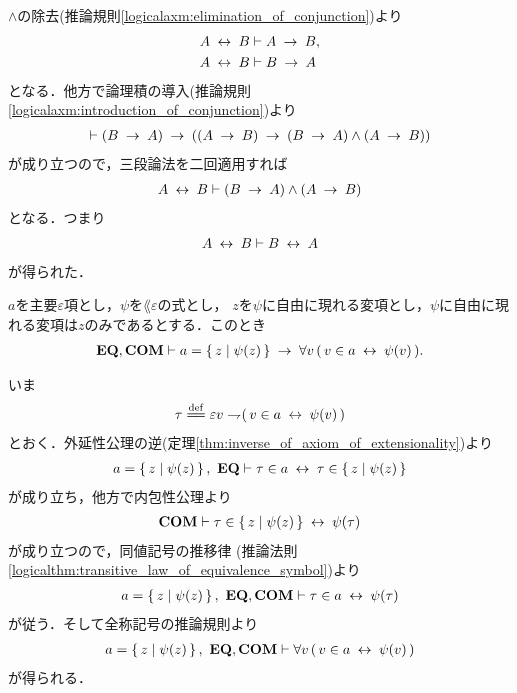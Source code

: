 	\begin{prf}
		$\wedge$の除去(推論規則\ref{logicalaxm:elimination_of_conjunction})より
		\begin{align}
			A \lrarrow B &\vdash A \rarrow B, \\
			A \lrarrow B &\vdash B \rarrow A
		\end{align}
		となる．他方で論理積の導入(推論規則\ref{logicalaxm:introduction_of_conjunction})より
		\begin{align}
			\vdash (B \rarrow A) \rarrow ((A \rarrow B) \rarrow 
			(B \rarrow A) \wedge (A \rarrow B))
		\end{align}
		が成り立つので，三段論法を二回適用すれば
		\begin{align}
			A \lrarrow B \vdash (B \rarrow A) \wedge (A \rarrow B)
		\end{align}
		となる．つまり
		\begin{align}
			A \lrarrow B \vdash B \lrarrow A
		\end{align}
		が得られた．
		\QED
	\end{prf}
	
	\begin{screen}
		\begin{thm}
		\label{thm:equivalent_formula_rewriting_1}
			$a$を主要$\varepsilon$項とし，$\psi$を$\lang{\varepsilon}$の式とし，
			$z$を$\psi$に自由に現れる変項とし，$\psi$に自由に現れる変項は$z$のみであるとする．このとき
			\begin{align}
				\EQAX,\COMAX \vdash a = \Set{z}{\psi(z)} 
				\rarrow \forall v\, (\, v \in a \lrarrow \psi(v)\, ).
			\end{align}
		\end{thm}
	\end{screen}
	
	\begin{sketch}
		いま
		\begin{align}
			\tau \defeq \varepsilon v \negation (\, v \in a \lrarrow \psi(v)\, )
		\end{align}
		とおく．外延性公理の逆(定理\ref{thm:inverse_of_axiom_of_extensionality})より
		\begin{align}
			a = \Set{z}{\psi(z)},\ \EQAX \vdash 
			\tau \in a \lrarrow \tau \in \Set{z}{\psi(z)}
		\end{align}
		が成り立ち，他方で内包性公理より
		\begin{align}
			\COMAX \vdash \tau \in \Set{z}{\psi(z)} \lrarrow \psi(\tau)
		\end{align}
		が成り立つので，同値記号の推移律
		(推論法則\ref{logicalthm:transitive_law_of_equivalence_symbol})より
		\begin{align}
			a = \Set{z}{\psi(z)},\ \EQAX,\COMAX \vdash \tau \in a \lrarrow \psi(\tau)
		\end{align}
		が従う．そして全称記号の推論規則より
		\begin{align}
			a = \Set{z}{\psi(z)},\ \EQAX,\COMAX \vdash 
			\forall v\, (\, v \in a \lrarrow \psi(v)\, )
		\end{align}
		が得られる．
		\QED
	\end{sketch}
	
